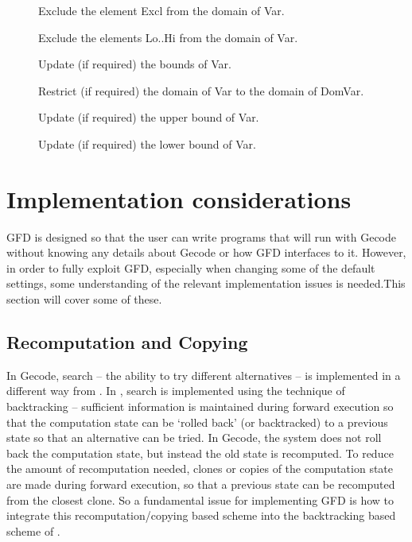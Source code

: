 \begin{description}
\item[]
Exclude the element Excl from the domain of Var.

\item[]
Exclude the elements Lo..Hi from the domain of Var.

\item[]
Update (if required) the bounds of Var.

\item[]
Restrict (if required) the domain of Var to the domain of DomVar.

\item[]
Update (if required) the upper bound of Var.

\item[]
Update (if required) the lower bound of Var.

\end{description}


\section{Implementation considerations}
\label{gfdimpl}

GFD is designed so that the user can write programs that will run with
 Gecode without knowing any details about Gecode or how GFD interfaces
 to it. However, in order to fully exploit GFD, especially when
 changing some of the default settings, some understanding of the
 relevant implementation issues is needed.This section will cover some
of these.

\subsection{Recomputation and Copying}

In Gecode, search -- the ability to try different alternatives -- is 
implemented in a different way from \eclipse. In \eclipse, search is
implemented using the technique of backtracking -- sufficient
 information is maintained during forward execution so that the
 computation state can be `rolled
 back' (or backtracked) to a previous state so that an alternative can be 
tried. In Gecode, the system does not roll back the computation state,
 but instead the old state is recomputed. To reduce the amount of
 recomputation needed, clones or copies of the computation state are made
 during forward execution, so that a previous state can be recomputed
 from the closest clone. So a fundamental issue for implementing GFD
 is how to integrate this recomputation/copying based scheme into the 
backtracking based scheme of \eclipse.

